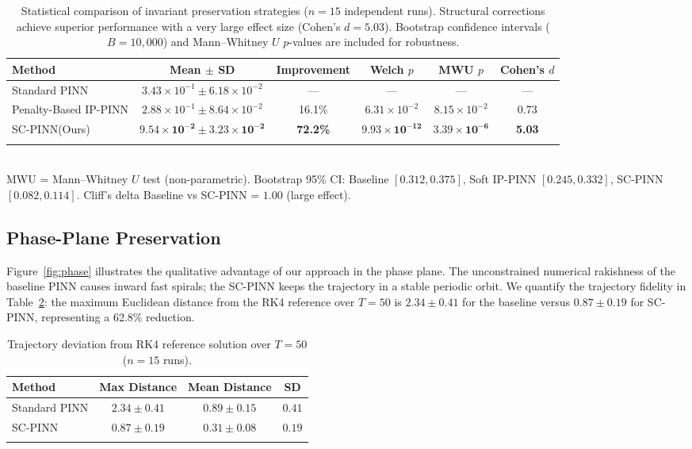 \documentclass[pdflatex,sn-mathphys-num]{sn-jnl}
\theoremstyle{thmstyleone}%
\theoremstyle{thmstyletwo}%
\theoremstyle{thmstylethree}%
\newcommand{\methodname}{SC-PINN}
\newcommand{\baseline}{Standard PINN}
\newcommand{\softpinn}{Penalty-Based IP-PINN}
\begin{document}
	\begin{table}[ht]
		\centering
		\footnotesize
		\caption{Statistical comparison of invariant preservation strategies ($n=15$ independent runs). Structural corrections achieve superior performance with a very large effect size (Cohen's $d = 5.03$). Bootstrap confidence intervals ($B=10{,}000$) and Mann--Whitney $U$ $p$-values are included for robustness.}
		\label{tab:three_way}
		\begin{tabular}{@{}lccccc@{}}
			\toprule
			\textbf{Method} & \textbf{Mean $\pm$ SD} & \textbf{Improvement} & \textbf{Welch $p$} & \textbf{MWU $p$} & \textbf{Cohen's $d$} \\
			\midrule
			\baseline & $3.43\times10^{-1} \pm 6.18\times10^{-2}$ & --- & --- & --- & --- \\
			\softpinn & $2.88\times10^{-1} \pm 8.64\times10^{-2}$ & 16.1\% & $6.31\times10^{-2}$ & $8.15\times10^{-2}$ & 0.73 \\
			\methodname (Ours) & $\mathbf{9.54\times10^{-2} \pm 3.23\times10^{-2}}$ & \textbf{72.2\%} & $\mathbf{9.93\times10^{-12}}$ & $\mathbf{3.39\times10^{-6}}$ & \textbf{5.03} \\
			\botrule
		\end{tabular}
		\\[3pt]
		\footnotesize{MWU = Mann--Whitney $U$ test (non-parametric). Bootstrap 95\% CI: Baseline $[0.312, 0.375]$, Soft IP-PINN $[0.245, 0.332]$, SC-PINN $[0.082, 0.114]$. Cliff's delta Baseline vs SC-PINN = $1.00$ (large effect).}
	\end{table}
	
	\subsection{Phase-Plane Preservation}\label{subsec6.3}
	
	Figure~\ref{fig:phase} illustrates the qualitative advantage of our approach in the phase plane. The unconstrained numerical rakishness of the baseline PINN causes inward fast spirals; the SC-PINN keeps the trajectory in a stable periodic orbit. We quantify the trajectory fidelity in Table~\ref{tab:trajectory_deviation}: the maximum Euclidean distance from the RK4 reference over $T=50$ is $2.34 \pm 0.41$ for the baseline versus $0.87 \pm 0.19$ for SC-PINN, representing a 62.8\% reduction.
	
	\begin{table}[ht]
		\centering
		\caption{Trajectory deviation from RK4 reference solution over $T=50$ ($n=15$ runs).}
		\label{tab:trajectory_deviation}
		\begin{tabular}{@{}lccc@{}}
			\toprule
			\textbf{Method} & \textbf{Max Distance} & \textbf{Mean Distance} & \textbf{SD} \\
			\midrule
			\baseline & $2.34 \pm 0.41$ & $0.89 \pm 0.15$ & $0.41$ \\
			\methodname & $\mathbf{0.87 \pm 0.19}$ & $\mathbf{0.31 \pm 0.08}$ & $0.19$ \\
			\botrule
		\end{tabular}
	\end{table}
	
\end{document}
